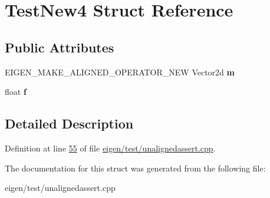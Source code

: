 \hypertarget{struct_test_new4}{}\section{Test\+New4 Struct Reference}
\label{struct_test_new4}
\subsection*{Public Attributes}
\begin{DoxyCompactItemize}
\item 
\mbox{\label{struct_test_new4_addf1fbfd7c984fcefb7d1029baaedd1d}} 
E\+I\+G\+E\+N\+\_\+\+M\+A\+K\+E\+\_\+\+A\+L\+I\+G\+N\+E\+D\+\_\+\+O\+P\+E\+R\+A\+T\+O\+R\+\_\+\+N\+EW Vector2d {\bfseries m}
\item 
\mbox{\label{struct_test_new4_a480db8379b2d8c07c03e0da44ca785b2}} 
float {\bfseries f}
\end{DoxyCompactItemize}


\subsection{Detailed Description}


Definition at line \hyperlink{eigen_2test_2unalignedassert_8cpp_source_l00055}{55} of file \hyperlink{eigen_2test_2unalignedassert_8cpp_source}{eigen/test/unalignedassert.\+cpp}.



The documentation for this struct was generated from the following file\+:\begin{DoxyCompactItemize}
\item 
eigen/test/unalignedassert.\+cpp\end{DoxyCompactItemize}
